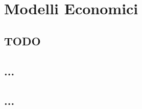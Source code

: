 
\chapter{Modelli Economici}

\section{TODO}

\section{...}
\label{sec:01_...}

% 

\section{...}
\label{sec:02_...}


